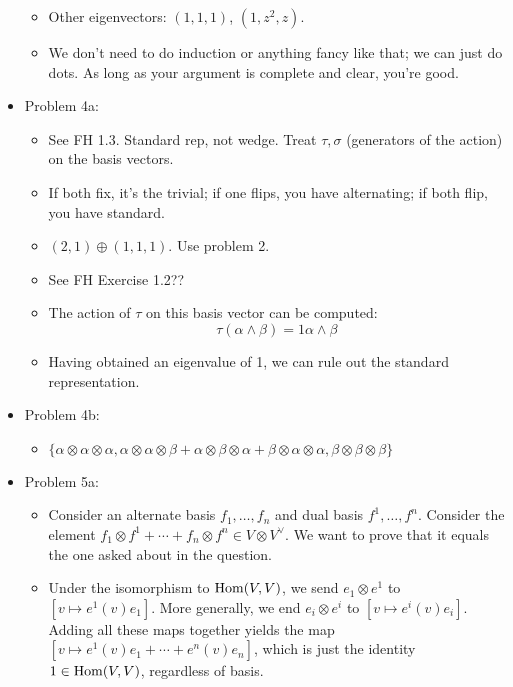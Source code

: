\documentclass[../notes.tex]{subfiles}
\begin{document}
\begin{itemize}
\begin{itemize}
        \item Other eigenvectors: $(1,1,1)$, $(1,z^2,z)$.
        \item We don't need to do induction or anything fancy like that; we can just do dots. As long as your argument is complete and clear, you're good.
    \end{itemize}
    \item Problem 4a:
    \begin{itemize}
        \item See FH 1.3. Standard rep, not wedge. Treat $\tau,\sigma$ (generators of the action) on the basis vectors.
        \item If both fix, it's the trivial; if one flips, you have alternating; if both flip, you have standard.
        \item $(2,1)\oplus(1,1,1)$. Use problem 2.
        \item See FH Exercise 1.2??
        \item The action of $\tau$ on this basis vector can be computed:
        \begin{equation*}
            \tau(\alpha\wedge\beta) = 1\alpha\wedge\beta
        \end{equation*}
        \item Having obtained an eigenvalue of 1, we can rule out the standard representation. 
    \end{itemize}
    \item Problem 4b:
    \begin{itemize}
        \item $\{\alpha\otimes\alpha\otimes\alpha,\alpha\otimes\alpha\otimes\beta+\alpha\otimes\beta\otimes\alpha+\beta\otimes\alpha\otimes\alpha,\beta\otimes\beta\otimes\beta\}$
    \end{itemize}
    \item Problem 5a:
    \begin{itemize}
        \item Consider an alternate basis $f_1,\dots,f_n$ and dual basis $f^1,\dots,f^n$. Consider the element $f_1\otimes f^1+\cdots+f_n\otimes f^n\in V\otimes V^\vee$. We want to prove that it equals the one asked about in the question.
        \item Under the isomorphism to $\operatorname{Hom}(V,V)$, we send $e_1\otimes e^1$ to $[v\mapsto e^1(v)e_1]$. More generally, we end $e_i\otimes e^i$ to $[v\mapsto e^i(v)e_i]$. Adding all these maps together yields the map $[v\mapsto e^1(v)e_1+\cdots+e^n(v)e_n]$, which is just the identity $1\in\operatorname{Hom}(V,V)$, regardless of basis.

\end{itemize}
\end{itemize}
\end{document}

